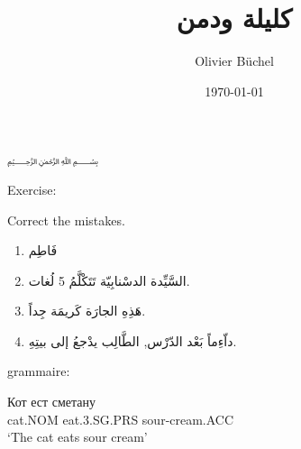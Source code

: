 \documentclass[a4paper]{article}
\title{كليلة ودمن}
\author{Olivier Büchel}
\date{\today}
\begin{document}
\maketitle
﷽

Exercise:

Correct the mistakes.



\begin{enumerate}
\item فَاطِم
\item  السَّيِّدة الدسْنابِيّة تَتَكْلَّمُ 5 لُغات.
\item هَذِهِ الجارَة كَريمَة جِداً.
\item  داّءِماً بَعْد الدّرْس, الطَّالِب يدْجعُ  إلى بيتِهِ.

\end{enumerate}

grammaire:
\begin{exe}
\ex 
\gll Кот ест сметану\\
cat.NOM eat.3.SG.PRS sour-cream.ACC\\
\trans `The cat eats sour cream'
\end{exe}
\end{document}
